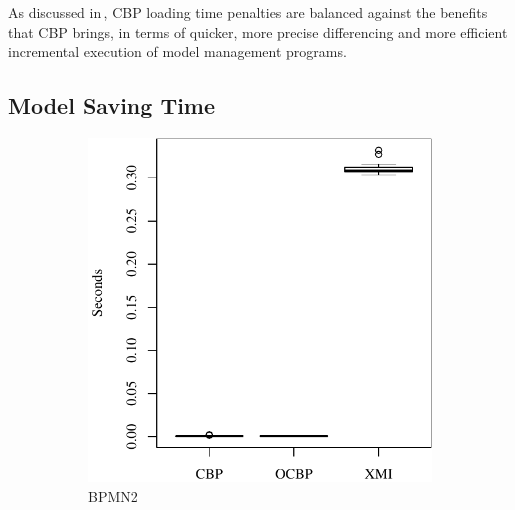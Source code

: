 \documentclass{llncs}
\begin{document}
    As discussed in\,\cite{yohannis2017turning}, CBP loading time penalties are balanced against the benefits that CBP brings, in terms of quicker, more precise differencing and more efficient incremental execution of model management programs.
    
    \subsection{Model Saving Time}
    \label{subsec:saving_time_test}
    
    
    
    \begin{figure}[ht]
\begin{subfigure}{0.325\textwidth}
    \centering
    \includegraphics[width=\linewidth]{images/save_time_bpmn2}
    \caption{BPMN2}
    \label{fig:save_time_bpmn2}
\end{subfigure}
\hfill
\begin{subfigure}{0.325\textwidth}
    \centering

\end{subfigure}
\end{figure}
\end{document}
